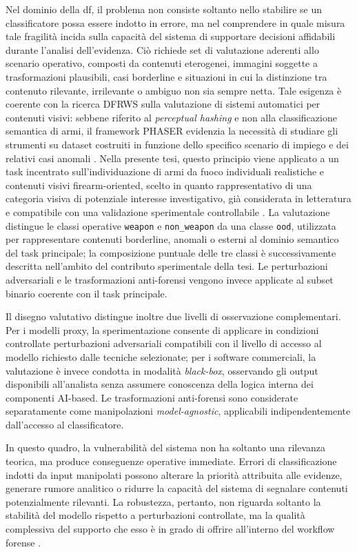 Nel dominio della \gls{df}, il problema non consiste soltanto nello stabilire se un classificatore possa essere indotto in errore, ma nel comprendere in quale misura tale fragilità incida sulla capacità del sistema di supportare decisioni affidabili durante l'analisi dell'evidenza. Ciò richiede set di valutazione aderenti allo scenario operativo, composti da contenuti eterogenei, immagini soggette a trasformazioni plausibili, casi borderline e situazioni in cui la distinzione tra contenuto rilevante, irrilevante o ambiguo non sia sempre netta. Tale esigenza è coerente con la ricerca DFRWS sulla valutazione di sistemi automatici per contenuti visivi: sebbene riferito al \textit{perceptual hashing} e non alla classificazione semantica di armi, il framework PHASER evidenzia la necessità di studiare gli strumenti su dataset costruiti in funzione dello specifico scenario di impiego e dei relativi casi anomali \cite{mckeown2024phaser}. Nella presente tesi, questo principio viene applicato a un task incentrato sull'individuazione di armi da fuoco individuali realistiche e contenuti visivi firearm-oriented, scelto in quanto rappresentativo di una categoria visiva di potenziale interesse investigativo, già considerata in letteratura e compatibile con una validazione sperimentale controllabile \cite{silva2021microservices,Hao2018DeepFirearm}. La valutazione distingue le classi operative \texttt{weapon} e \texttt{non\_weapon} da una classe \texttt{ood}, utilizzata per rappresentare contenuti borderline, anomali o esterni al dominio semantico del task principale; la composizione puntuale delle tre classi è successivamente descritta nell'ambito del contributo sperimentale della tesi. Le perturbazioni adversariali e le trasformazioni anti-forensi vengono invece applicate al subset binario coerente con il task principale.

Il disegno valutativo distingue inoltre due livelli di osservazione complementari. Per i modelli proxy, la sperimentazione consente di applicare in condizioni controllate perturbazioni adversariali compatibili con il livello di accesso al modello richiesto dalle tecniche selezionate; per i software commerciali, la valutazione è invece condotta in modalità \textit{black-box}, osservando gli output disponibili all'analista senza assumere conoscenza della logica interna dei componenti AI-based. Le trasformazioni anti-forensi sono considerate separatamente come manipolazioni \textit{model-agnostic}, applicabili indipendentemente dall'accesso al classificatore.

In questo quadro, la vulnerabilità del sistema non ha soltanto una rilevanza teorica, ma produce conseguenze operative immediate. Errori di classificazione indotti da input manipolati possono alterare la priorità attribuita alle evidenze, generare rumore analitico o ridurre la capacità del sistema di segnalare contenuti potenzialmente rilevanti. La robustezza, pertanto, non riguarda soltanto la stabilità del modello rispetto a perturbazioni controllate, ma la qualità complessiva del supporto che esso è in grado di offrire all'interno del workflow forense \cite{sanna2024preliminary,sanna2025pixelperfect}.

